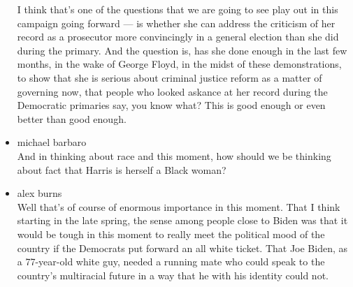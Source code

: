\begin{itemize}
  I think that's one of the questions that we are going to see play out
  in this campaign going forward --- is whether she can address the
  criticism of her record as a prosecutor more convincingly in a general
  election than she did during the primary. And the question is, has she
  done enough in the last few months, in the wake of George Floyd, in
  the midst of these demonstrations, to show that she is serious about
  criminal justice reform as a matter of governing now, that people who
  looked askance at her record during the Democratic primaries say, you
  know what? This is good enough or even better than good enough.
\item
  michael barbaro\\
  And in thinking about race and this moment, how should we be thinking
  about fact that Harris is herself a Black woman?
\item
  alex burns\\
  Well that's of course of enormous importance in this moment. That I
  think starting in the late spring, the sense among people close to
  Biden was that it would be tough in this moment to really meet the
  political mood of the country if the Democrats put forward an all
  white ticket. That Joe Biden, as a 77-year-old white guy, needed a
  running mate who could speak to the country's multiracial future in a
  way that he with his identity could not.


\end{itemize}
